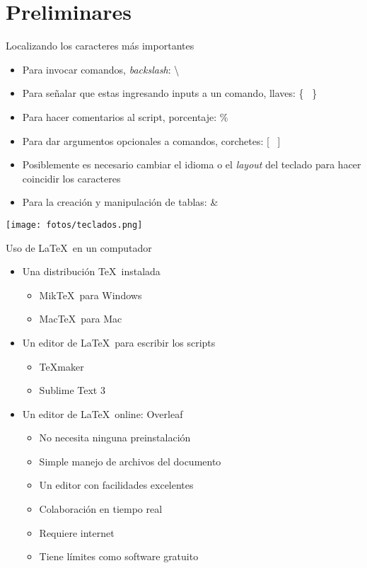 \documentclass{beamer}
\begin{document}
\section{Preliminares}
\begin{frame}{Localizando los caracteres más importantes}
    \begin{itemize}
        \item Para invocar comandos, \textit{backslash}: \textbackslash
             \item Para señalar que estas ingresando inputs a un comando, llaves: \{ \ \}
             \item Para hacer comentarios al script, porcentaje: \%
             \item Para dar argumentos opcionales a comandos, corchetes: [ \ ]
             \item Posiblemente es necesario cambiar el idioma o el \textit{layout} del teclado para hacer coincidir los caracteres
        \item Para la creación y manipulación de tablas: \&  
         \end{itemize}
         \centering
         \texttt{[image: fotos/teclados.png]}
 \end{frame}
 \begin{frame}{Uso de \LaTeX \ en un computador}
\begin{itemize}
    \item Una distribución \TeX \ instalada
    \begin{itemize}
        \item Mik\TeX \ para Windows
        \item Mac\TeX \ para Mac
 \end{itemize}
   \item Un editor de \LaTeX \ para escribir los scripts
    \begin{itemize}
        \item \TeX maker
        \item Sublime Text 3
    \end{itemize}
     \item Un editor de \LaTeX \ online: Overleaf
     \begin{itemize}
         \item No necesita ninguna preinstalación
         \item Simple manejo de archivos del documento
         \item Un editor con facilidades excelentes
         \item Colaboración en tiempo real
         \item Requiere internet 
         \item Tiene límites como software gratuito
     \end{itemize}
  \end{itemize}
 \end{frame}
\end{document}
